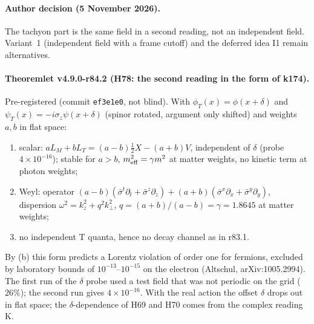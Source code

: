 \paragraph{Author decision (5 November 2026).}
The tachyon part is the same field in a second reading, not an independent field.  Variant~1 (independent field with a frame cutoff)
and the deferred idea I1 remain alternatives.

\paragraph{Theoremlet v4.9.0-r84.2 (H78: the second reading in the form of k174).}
Pre-registered (commit \texttt{ef3e1e0}, not blind).  With \(\phi_T(x)=\phi(x+\delta)\) and \(\psi_T(x)=-i\sigma_z\psi(x+\delta)\) (spinor
rotated, argument only shifted) and weights \(a,b\) in flat space:
\begin{enumerate}[leftmargin=2em]
\item[(a)] scalar: \(aL_M+bL_T=(a-b)\tfrac12X-(a+b)V\), independent of \(\delta\) (probe \(4\times10^{-16}\)); stable for \(a>b\),
\(m_{\rm eff}^2=\gamma m^2\) at matter weights, no kinetic term at photon weights;
\item[(b)] Weyl: operator \((a-b)(\bar\sigma^t\partial_t+\bar\sigma^z\partial_z)+(a+b)(\bar\sigma^x\partial_x+\bar\sigma^y\partial_y)\), dispersion
\(\omega^2=k_z^2+q^2k_\perp^2\), \(q=(a+b)/(a-b)=\gamma=1.8645\) at matter weights;
\item[(c)] no independent T quanta, hence no decay channel as in r83.1.
\end{enumerate}
By (b) this form predicts a Lorentz violation of order one for fermions, excluded by laboratory bounds of \(10^{-13}\)--\(10^{-15}\) on
the electron (Altschul, arXiv:1005.2994).  The first run of the \(\delta\) probe used a test field that was not periodic on the grid
(\(26\%\)); the second run gives \(4\times10^{-16}\).  With the real action the offset \(\delta\) drops out in flat space; the
\(\delta\)-dependence of H69 and H70 comes from the complex reading K.

